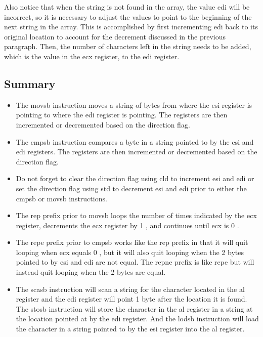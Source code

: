 \documentclass[10pt]{book}
\begin{document}
Also notice that when the string is not found in the array, the value edi will be incorrect, so it is necessary to adjust the values to point to the beginning of the next string in the array. This is accomplished by first incrementing edi back to its original location to account for the decrement discussed in the previous paragraph. Then, the number of characters left in the string needs to be added, which is the value in the ecx register, to the edi register.

\subsection{Summary}
\begin{itemize}
  \item The movsb instruction moves a string of bytes from where the esi register is pointing to where the edi register is pointing. The registers are then incremented or decremented based on the direction flag.
  \item The cmpsb instruction compares a byte in a string pointed to by the esi and edi registers. The registers are then incremented or decremented based on the direction flag.
  \item Do not forget to clear the direction flag using cld to increment esi and edi or set the direction flag using std to decrement esi and edi prior to either the cmpsb or movsb instructions.
  \item The rep prefix prior to movsb loops the number of times indicated by the ecx register, decrements the ecx register by 1 , and continues until ecx is 0 .
  \item The repe prefix prior to cmpsb works like the rep prefix in that it will quit looping when ecx equals 0 , but it will also quit looping when the 2 bytes pointed to by esi and edi are not equal. The repne prefix is like repe but will instead quit looping when the 2 bytes are equal.
  \item The scasb instruction will scan a string for the character located in the al register and the edi register will point 1 byte after the location it is found. The stosb instruction will store the character in the al register in a string at the location pointed at by the edi register. And the lodsb instruction will load the character in a string pointed to by the esi register into the al register.
\end{itemize}


\end{document}
